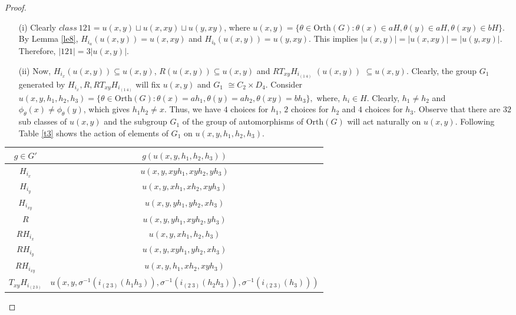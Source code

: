 \documentclass[11pt,a4paper]{article}
\theoremstyle{definition}
\theoremstyle{remark}
\begin{document}
\begin{proof}\begin{enumerate}
		\item [(i)] 	Clearly $class~121 = u(x,y) \sqcup u(x,xy) \sqcup u(y,xy)$, where
		$u(x,y) = \{\theta \in \text{Orth}(G): \theta(x) \in aH, \theta(y) \in aH, \theta(xy) \in bH\}$. By Lemma \ref{le8}, $H_{i_{a}}(u(x,y)) = u(x,xy)$ and  $H_{i_{b}}(u(x,y)) = u(y,xy).$ This implies $\vert u(x,y) \vert = \vert u(x,xy) \vert = \vert u(y,xy) \vert$. Therefore, 	$\vert 121 \vert = 3\vert u(x,y) \vert$.
		\item [(ii)] 	Now, $H_{i_{x}}(u(x,y)) \subseteq u(x,y)$, $R(u(x,y)) \subseteq u(x,y)$ and $RT_{xy}H_{i_{(1~4)}}$ $(u(x,y))$ $  \subseteq u(x,y)$. Clearly, the group $G_{1}$ generated by $ H_{i_{x}}, R, RT_{xy}H_{i_{(1~4)}}$ will fix $u(x,y)$ and $G_{1}$ $ \cong C_{2} \times D_{4}$. Consider $u(x,y,h_{1},h_{2},h_{3}) = \{\theta \in \text{Orth}(G) : \theta(x) = ah_{1}, \theta(y) = ah_{2}, \theta(xy) = bh_{3}\},$ where, $h_{i} \in H$. Clearly, $h_{1} \neq h_{2}$ and $\phi_{\theta}(x) \neq \phi_{\theta}(y)$, which gives $h_{1}h_{2} \neq x$. Thus, we have $4$ choices for $h_{1}$, $2$ choices for $h_{2}$ and $4$ choices for $h_{3}$. Observe that there are $32$ sub classes of $u(x,y)$ and the subgroup $G_{1}$ of the group of automorphisms of $\text{Orth}(G)$ will act naturally on $u(x,y)$. Following Table \ref{t3} shows the action of elements of $G_{1}$ on $u(x,y,h_{1},h_{2},h_{3})$.
	\end{enumerate}
		\begin{table}[H]
			\begin{tabular}{|c|c|}
					\hline
					$g \in G'$ & $g(u(x,y,h_{1},h_{2},h_{3}))$\\ \hline
					$H_{i_{x}}$ & $u(x,y,xyh_{1},xyh_{2},yh_{3})$\\ \hline
					$H_{i_{y}}$ & $u(x,y,xh_{1},xh_{2},xyh_{3})$\\ \hline
					$H_{i_{xy}}$ & $u(x,y,yh_{1},yh_{2},xh_{3})$ \\ \hline 
					$R$ & $u(x,y,yh_{1},xyh_{2},yh_{3})$ \\ \hline
					$RH_{i_{x}}$ & $u(x,y,xh_{1},h_{2},h_{3})$ \\ \hline
					$RH_{i_{y}}$ & $u(x,y,xyh_{1},yh_{2},xh_{3})$ \\ \hline
					$RH_{i_{xy}}$ & $u(x,y,h_{1},xh_{2},xyh_{3})$ \\ \hline
					$T_{xy}H_{i_{(2~3)}}$ & $u(x,y, \sigma^{-1}(i_{(2~3)}(h_{1}h_{3})),\sigma^{-1}(i_{(2~3)}(h_{2}h_{3})), \sigma^{-1}(i_{(2~3)}(h_{3})))$ \\ \hline

\end{tabular}
\end{table}
\end{proof}
\end{document}
